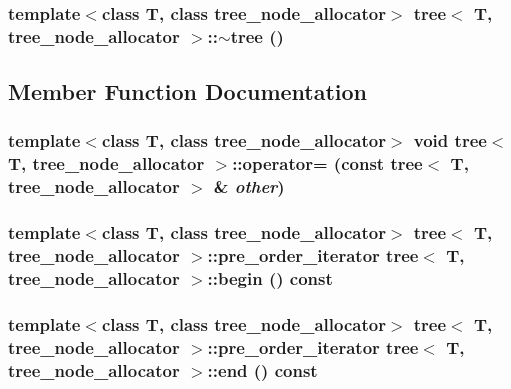 \hypertarget{classtree_f0169b515c95f4299fd2d984137b7868}{
\subsubsection{\setlength{\rightskip}{0pt plus 5cm}template$<$class T, class tree\_\-node\_\-allocator$>$ {\bf tree}$<$ T, tree\_\-node\_\-allocator $>$::$\sim${\bf tree} ()}}
\label{classtree_f0169b515c95f4299fd2d984137b7868}




\subsection{Member Function Documentation}
\hypertarget{classtree_9561c0c73b0605f32bf82a026eaf216a}{
\subsubsection{\setlength{\rightskip}{0pt plus 5cm}template$<$class T, class tree\_\-node\_\-allocator$>$ void {\bf tree}$<$ T, tree\_\-node\_\-allocator $>$::operator= (const {\bf tree}$<$ T, tree\_\-node\_\-allocator $>$ \& {\em other})}}
\label{classtree_9561c0c73b0605f32bf82a026eaf216a}


\hypertarget{classtree_76b3a629c0208d5ae5b4ffcd4492e05e}{
\subsubsection{\setlength{\rightskip}{0pt plus 5cm}template$<$class T, class tree\_\-node\_\-allocator$>$ {\bf tree}$<$ T, tree\_\-node\_\-allocator $>$::{\bf pre\_\-order\_\-iterator} {\bf tree}$<$ T, tree\_\-node\_\-allocator $>$::begin () const}}
\label{classtree_76b3a629c0208d5ae5b4ffcd4492e05e}


\hypertarget{classtree_0d09fe9fd34fbfc9c9e4e28cb694448e}{
\subsubsection{\setlength{\rightskip}{0pt plus 5cm}template$<$class T, class tree\_\-node\_\-allocator$>$ {\bf tree}$<$ T, tree\_\-node\_\-allocator $>$::{\bf pre\_\-order\_\-iterator} {\bf tree}$<$ T, tree\_\-node\_\-allocator $>$::end () const}}
\label{classtree_0d09fe9fd34fbfc9c9e4e28cb694448e}


